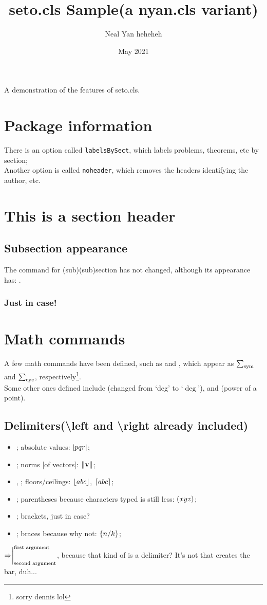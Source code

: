 \documentclass[labelsBySect]{seto}
\title{seto.cls Sample(a nyan.cls variant)}
\author{Neal Yan heheheh}
\date{May 2021}
\begin{document}
\maketitle
A demonstration of the features of seto.cls.
\section*{Package information}
There is an option called \texttt{labelsBySect}, which labels problems, theorems, etc by section;\\
Another option is called \texttt{noheader}, which removes the headers identifying the author, etc.
\toc 
\section{This is a section header}
\subsection{Subsection appearance}
The command for (sub)(sub)section has not changed, although its appearance has: .
\subsubsection{Just in case!}
\section{Math commands}
A few math commands have been defined, such as  and , which appear as $\symsum$ and $\cycsum$, respectively\footnote{sorry dennis lol}.\\
Some other ones defined include (changed from `deg' to `$\deg$'), and (power of a point).
\subsection{Delimiters(\textbackslash left and \textbackslash right already included)}
\begin{itemize}
    \item{}; absolute values: $\abs{pqr}$;
    \item{}; norms [of vectors]: $\norm{\textbf{v}}$;
    \item{}, ; floors/ceilings: $\floor{abc}$, $\ceil{abc}$;
    \item{}; parentheses because characters typed is still less: $\parenth{xyz}$;
    \item{}; brackets, just in case?
    \item{}; braces because why not: $\braces{n/k}$;
\end{itemize}
$\Rightarrow\evalat[\text{first argument}]{\text{second argument}}$, because that kind of is a delimiter? It's not  that creates the bar, duh...
\end{document}
